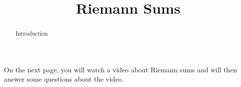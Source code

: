 \documentclass[handout]{ximera}
\title{Riemann Sums}
\begin{document}
\begin{abstract} Introduction %
\end{abstract}

\maketitle

On the next page, you will watch a video about Riemann sums and will then answer some questions about the video.
\end{document}
